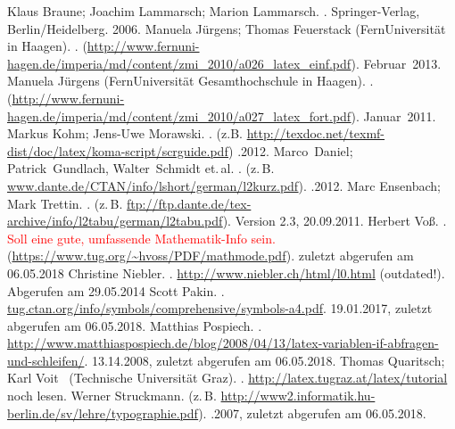\nocite{*}

\begin{thebibliography}{Wikibooks}

%
	Klaus Braune; Joachim Lammarsch; Marion Lammarsch. 
	.
	\newblock Springer-Verlag, Berlin/Heidelberg.
	\mbox{2006.}
%
	Manuela Jürgens; Thomas Feuerstack (FernUniversität in Haagen). 
	.
	\newblock (\url{http://www.fernuni-hagen.de/imperia/md/content/zmi_2010/a026_latex_einf.pdf}).
	\mbox{Februar~2013.}
%
	Manuela Jürgens (FernUniversität Gesamthochschule in Haagen). 
	.
	\newblock (\url{http://www.fernuni-hagen.de/imperia/md/content/zmi_2010/a027_latex_fort.pdf}).
	\mbox{Januar~2011.}
%
	Markus Kohm; Jens-Uwe Morawski. 
	.
	\newblock (z.B. \url{http://texdoc.net/texmf-dist/doc/latex/koma-script/scrguide.pdf})
	.2012.
%
	Marco~Daniel; Patrick~Gundlach, Walter~Schmidt et.\,al. 
	.
	\newblock (z.\,B. \url{www.dante.de/CTAN/info/lshort/german/l2kurz.pdf}).
	.2012.
%
	Marc Ensenbach; Mark Trettin.
	.
	\newblock (z.\,B. \url{ftp://ftp.dante.de/tex-archive/info/l2tabu/german/l2tabu.pdf}).
	\newblock Version 2.3, 20.09.2011.
%
	Herbert Voß.
	.  \textcolor{red}{Soll eine gute, umfassende Mathematik-Info sein.}
	\newblock (\url{https://www.tug.org/~hvoss/PDF/mathmode.pdf}).
	\newblock zuletzt abgerufen am 06.05.2018
%
	Christine Niebler.
	.
	\newblock \textcolor[rgb]{1,0,0}{\url{http://www.niebler.ch/html/l0.html} (outdated!)}.
	\newblock Abgerufen am {29.05.2014}
%
	Scott Pakin.
	.
	\newblock \url{tug.ctan.org/info/symbols/comprehensive/symbols-a4.pdf}. 19.01.2017, zuletzt abgerufen am 06.05.2018.
%
	Matthias Pospiech.
	.
	\newblock \url{http://www.matthiaspospiech.de/blog/2008/04/13/latex-variablen-if-abfragen-und-schleifen/}. 13.14.2008, zuletzt abgerufen am 06.05.2018.
%
	Thomas Quaritsch; Karl Voit \etal\ (Technische Universität Graz).
	.
	\newblock \url{http://latex.tugraz.at/latex/tutorial} noch lesen.
	Werner Struckmann.
	\newblock (z.\,B. \url{http://www2.informatik.hu-berlin.de/sv/lehre/typographie.pdf}).
	.2007, zuletzt abgerufen am 06.05.2018.
	

\end{thebibliography}

